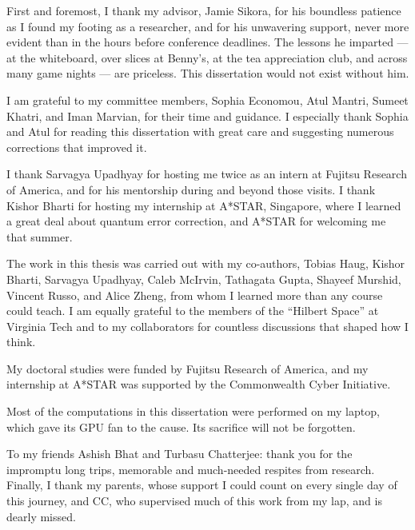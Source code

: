 First and foremost, I thank my advisor, Jamie Sikora, for his boundless patience as I found my footing as a researcher, and for his unwavering support, never more evident than in the hours before conference deadlines.
The lessons he imparted --- at the whiteboard, over slices at Benny's, at the tea appreciation club, and across many game nights --- are priceless.
This dissertation would not exist without him.

I am grateful to my committee members, Sophia Economou, Atul Mantri, Sumeet Khatri, and Iman Marvian, for their time and guidance. 
I especially thank Sophia and Atul for reading this dissertation with great care and suggesting numerous corrections that improved it.

I thank Sarvagya Upadhyay for hosting me twice as an intern at Fujitsu Research of America, and for his mentorship during and beyond those visits. 
I thank Kishor Bharti for hosting my internship at A*STAR, Singapore, where I learned a great deal about quantum error correction, and A*STAR for welcoming me that summer.

The work in this thesis was carried out with my co-authors, Tobias Haug, Kishor Bharti, Sarvagya Upadhyay, Caleb McIrvin, Tathagata Gupta, Shayeef Murshid, Vincent Russo, and Alice Zheng, from whom I learned more than any course could teach. 
I am equally grateful to the members of the ``Hilbert Space'' at Virginia Tech and to my collaborators for countless discussions that shaped how I think.

My doctoral studies were funded by Fujitsu Research of America, and my internship at A*STAR was supported by the Commonwealth Cyber Initiative.

Most of the computations in this dissertation were performed on my laptop, which gave its GPU fan to the cause. 
Its sacrifice will not be forgotten.

To my friends Ashish Bhat and Turbasu Chatterjee: thank you for the impromptu long trips, memorable and much-needed respites from research.
Finally, I thank my parents, whose support I could count on every single day of this journey, and CC, who supervised much of this work from my lap, and is dearly missed.